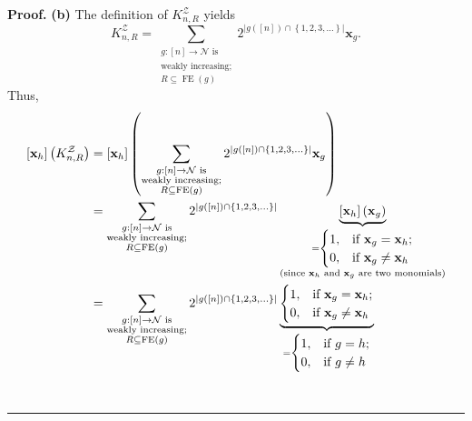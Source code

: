 \documentclass[numbers=enddot,12pt,final,onecolumn,notitlepage]{scrartcl}%
\theoremstyle{definition}
\newenvironment{proof}[1][Proof]{\noindent\textbf{#1.} }{\ \rule{0.5em}{0.5em}}
\newenvironment{vershort}{}{}
\let\sumnonlimits\sum
\renewcommand{\sum}{\sumnonlimits\limits}
\begin{document}
\begin{vershort}
\begin{proof}
\textbf{(b)} The definition of $K_{n,R}^{\mathcal{Z}}$ yields%
\[
K_{n,R}^{\mathcal{Z}}=\sum_{\substack{g:\left[  n\right]  \rightarrow
\mathcal{N}\text{ is}\\\text{weakly increasing;}\\R\subseteq\operatorname*{FE}%
\left(  g\right)  }}2^{\left\vert g\left(  \left[  n\right]  \right)
\cap\left\{  1,2,3,\ldots\right\}  \right\vert }\mathbf{x}_{g}.
\]
Thus,%
\begin{align*}
\left[  \mathbf{x}_{h}\right]  \left(  K_{n,R}^{\mathcal{Z}}\right)   &
=\left[  \mathbf{x}_{h}\right]  \left(  \sum_{\substack{g:\left[  n\right]
\rightarrow\mathcal{N}\text{ is}\\\text{weakly increasing;}\\R\subseteq
\operatorname*{FE}\left(  g\right)  }}2^{\left\vert g\left(  \left[  n\right]
\right)  \cap\left\{  1,2,3,\ldots\right\}  \right\vert }\mathbf{x}_{g}\right)
\\
&  =\sum_{\substack{g:\left[  n\right]  \rightarrow\mathcal{N}\text{
is}\\\text{weakly increasing;}\\R\subseteq\operatorname*{FE}\left(  g\right)
}}2^{\left\vert g\left(  \left[  n\right]  \right)  \cap\left\{
1,2,3,\ldots\right\}  \right\vert }\underbrace{\left[  \mathbf{x}_{h}\right]
\left(  \mathbf{x}_{g}\right)  }_{\substack{=%
\begin{cases}
1, & \text{if }\mathbf{x}_{g}=\mathbf{x}_{h};\\
0, & \text{if }\mathbf{x}_{g}\neq\mathbf{x}_{h}%
\end{cases}
\\\text{(since }\mathbf{x}_{h}\text{ and }\mathbf{x}_{g}\text{ are two
monomials)}}}\\
&  =\sum_{\substack{g:\left[  n\right]  \rightarrow\mathcal{N}\text{
is}\\\text{weakly increasing;}\\R\subseteq\operatorname*{FE}\left(  g\right)
}}2^{\left\vert g\left(  \left[  n\right]  \right)  \cap\left\{
1,2,3,\ldots\right\}  \right\vert }\underbrace{%
\begin{cases}
1, & \text{if }\mathbf{x}_{g}=\mathbf{x}_{h};\\
0, & \text{if }\mathbf{x}_{g}\neq\mathbf{x}_{h}%
\end{cases}
}_{\substack{=%
\begin{cases}
1, & \text{if }g=h;\\
0, & \text{if }g\neq h
\end{cases}
}}
\end{align*}
\end{proof}
\end{vershort}
\end{document}

